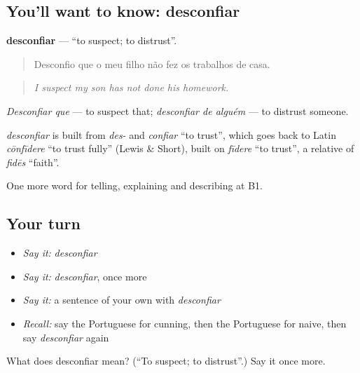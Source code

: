 \subsection*{You'll want to know: desconfiar}
\textbf{desconfiar} — \textquotedblleft{}to suspect; to distrust\textquotedblright{}.

\begin{quote}
Desconfio que o meu filho não fez os trabalhos de casa.
\end{quote}

\begin{quote}
\emph{I suspect my son has not done his homework.}
\end{quote}

\emph{Desconfiar que} — to suspect that; \emph{desconfiar de alguém} — to distrust someone.

\begin{cousinweb}
\emph{desconfiar} is built from \emph{des-} and \emph{confiar} \textquotedblleft{}to trust\textquotedblright{}, which goes back to Latin \emph{cōnfīdere} \textquotedblleft{}to trust fully\textquotedblright{} (Lewis \& Short), built on \emph{fīdere} \textquotedblleft{}to trust\textquotedblright{}, a relative of \emph{fidēs} \textquotedblleft{}faith\textquotedblright{}.
\end{cousinweb}

\begin{grammarlens}[title={What you've built}]
One more word for telling, explaining and describing at B1.
\end{grammarlens}

\subsection*{Your turn}
\begin{itemize}
\raggedright
  \item \emph{Say it:} \emph{desconfiar}
  \item \emph{Say it:} \emph{desconfiar}, once more
  \item \emph{Say it:} a sentence of your own with \emph{desconfiar}
  \item \emph{Recall:} say the Portuguese for cunning, then the Portuguese for naive, then say \emph{desconfiar} again
\end{itemize}

\begin{tcolorbox}[breakable,colback=teal!4,colframe=teal!35!black,title={Before you move on}]
What does desconfiar mean? (\textquotedblleft{}To suspect; to distrust\textquotedblright{}.) Say it once more.
\end{tcolorbox}
